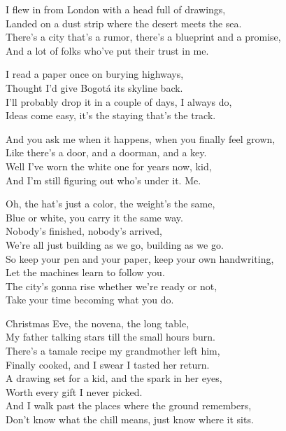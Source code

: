 \begin{lyrics}
I flew in from London with a head full of drawings,\\
Landed on a dust strip where the desert meets the sea.\\
There’s a city that’s a rumor, there’s a blueprint and a promise,\\
And a lot of folks who’ve put their trust in me.

I read a paper once on burying highways,\\
Thought I’d give Bogotá its skyline back.\\
I’ll probably drop it in a couple of days, I always do,\\
Ideas come easy, it’s the staying that’s the track.

And you ask me when it happens, when you finally feel grown,\\
Like there’s a door, and a doorman, and a key.\\
Well I’ve worn the white one for years now, kid,\\
And I’m still figuring out who’s under it. Me.

Oh, the hat’s just a color, the weight’s the same,\\
Blue or white, you carry it the same way.\\
Nobody’s finished, nobody’s arrived,\\
We’re all just building as we go, building as we go.\\
So keep your pen and your paper, keep your own handwriting,\\
Let the machines learn to follow you.\\
The city’s gonna rise whether we’re ready or not,\\
Take your time becoming what you do.

Christmas Eve, the novena, the long table,\\
My father talking stars till the small hours burn.\\
There’s a tamale recipe my grandmother left him,\\
Finally cooked, and I swear I tasted her return.\\
A drawing set for a kid, and the spark in her eyes,\\
Worth every gift I never picked.\\
And I walk past the places where the ground remembers,\\
Don’t know what the chill means, just know where it sits.


\end{lyrics}
